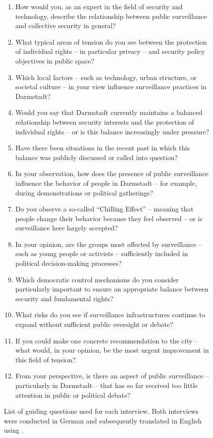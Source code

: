 \documentclass[12pt]{article}
\begin{document}
\begin{appendices}
		\begin{figure}[H]
			\begin{enumerate}[itemsep=0.1em, topsep=0.1em]
				\footnotesize
				\item How would you, as an expert in the field of security and technology, describe the relationship between public surveillance and collective security in general?
				\item What typical areas of tension do you see between the protection of individual rights – in particular privacy – and security policy objectives in public space?
				\item Which local factors – such as technology, urban structure, or societal culture – in your view influence surveillance practices in Darmstadt?
				\item Would you say that Darmstadt currently maintains a balanced relationship between security interests and the protection of individual rights – or is this balance increasingly under pressure?
				\item Have there been situations in the recent past in which this balance was publicly discussed or called into question?
				\item In your observation, how does the presence of public surveillance influence the behavior of people in Darmstadt – for example, during demonstrations or political gatherings?
				\item Do you observe a so-called ``Chilling Effect'' – meaning that people change their behavior because they feel observed – or is surveillance here largely accepted?
				\item In your opinion, are the groups most affected by surveillance – such as young people or activists – sufficiently included in political decision-making processes?
				\item Which democratic control mechanisms do you consider particularly important to ensure an appropriate balance between security and fundamental rights?
				\item What risks do you see if surveillance infrastructures continue to expand without sufficient public oversight or debate?
				\item If you could make one concrete recommendation to the city – what would, in your opinion, be the most urgent improvement in this field of tension?
				\item From your perspective, is there an aspect of public surveillance – particularly in Darmstadt – that has so far received too little attention in public or political debate?
			\end{enumerate}
			\caption{List of guiding questions used for each interview. Both interviews were conducted in German and subsequently translated in English using \textcite{googletranslate}.}
		\end{figure}
		

\end{appendices}
\end{document}
